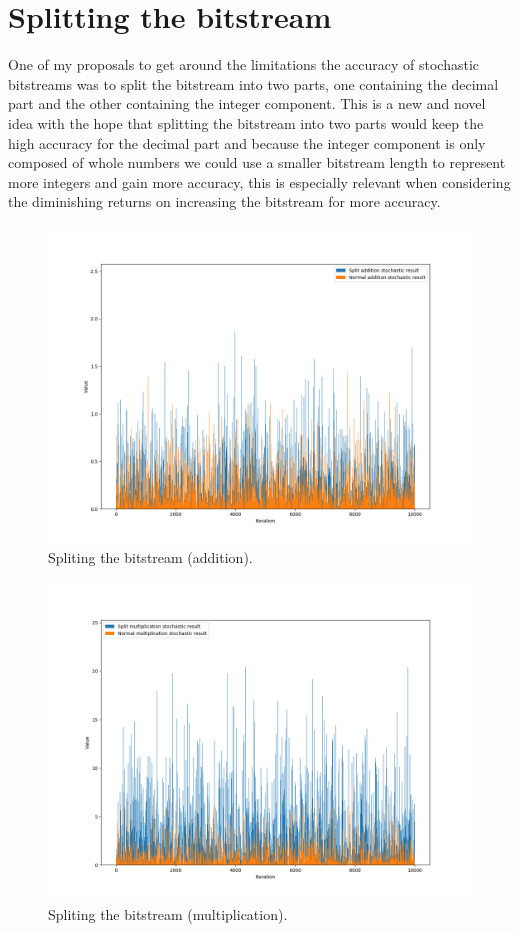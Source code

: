 \documentclass[a4paper,oneside,phd,etd]{BYUPhys}
\begin{document}
\section{Splitting the bitstream}
One of my proposals to get around the limitations the accuracy of stochastic bitstreams was to split the bitstream into two parts, one containing the decimal part and the other containing the integer component. This is a new and novel idea with the hope that splitting the bitstream into two parts would keep the high accuracy for the decimal part and because the integer component is only composed of whole numbers we could use a smaller bitstream length to represent more integers and gain more accuracy, this is especially relevant when considering the diminishing returns on increasing the bitstream for more accuracy.
\begin{figure}[H]
\centering
\includegraphics[scale=0.40]{results/split-add.png}
\caption{Spliting the bitstream (addition).}
\label{fig:spliting}
\end{figure}
\begin{figure}[H]
\centering
\includegraphics[scale=0.40]{results/split-mult.png}
\caption{Spliting the bitstream (multiplication).}
\label{fig:spliting}
\end{figure}
\end{document}
